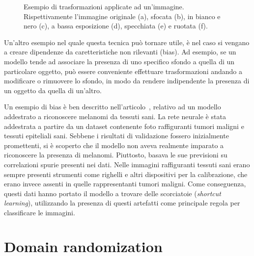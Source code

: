 \documentclass[12pt]{report}
\begin{document}
\begin{figure}[t]
	\hspace{0.01\textwidth}
	\caption{Esempio di trasformazioni applicate ad un'immagine. Rispettivamente l'immagine originale (a), sfocata (b), in bianco e nero (c), a bassa esposizione (d), specchiata (e) e ruotata (f).}
	\label{fig:immagine-augmentata}
\end{figure}

Un'altro esempio nel quale questa tecnica può tornare utile, è nel caso si vengano a creare dipendenze da caretteristiche non rilevanti (bias). Ad esempio, se un modello tende ad associare la presenza di uno specifico sfondo a quella di un particolare oggetto, può essere conveniente effettuare trasformazioni andando a modificare o rimuovere lo sfondo, in modo da rendere indipendente la presenza di un oggetto da quella di un'altro.

Un esempio di bias è ben descritto nell'articolo~\cite{diagnostics12010040}, relativo ad un modello addestrato a riconoscere melanomi da tessuti sani. La rete neurale è stata addestrata a partire da un dataset contenente foto raffiguranti tumori maligni e tessuti epiteliali sani. Sebbene i risultati di validazione fossero inizialmente promettenti, si è scoperto che il modello non aveva realmente imparato a riconoscere la presenza di melanomi. Piuttosto, basava le sue previsioni su correlazioni spurie presenti nei dati. Nelle immagini raffiguranti tessuti sani erano sempre presenti strumenti come righelli e altri dispositivi per la calibrazione, che erano invece assenti in quelle rappresentanti tumori maligni. Come conseguenza, questi dati hanno portato il modello a trovare delle scorciatoie (\textit{shortcut learning}), utilizzando la presenza di questi artefatti come principale regola per classificare le immagini.

\section{Domain randomization}
\label{sec:randomization}
\end{document}
